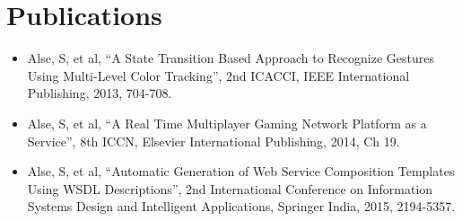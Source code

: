 \documentclass[a4paper,10pt]{article} %
\begin{document}
\section{Publications}
\begin{itemize}
\item Alse, S, et al, ``A State Transition Based Approach to Recognize Gestures Using Multi-Level Color Tracking'', 2nd ICACCI, IEEE International Publishing, 2013, 704-708.
\item Alse, S, et al, ``A Real Time Multiplayer Gaming Network Platform as a Service'', 8th ICCN, Elsevier International Publishing, 2014, Ch 19.
\item Alse, S, et al, ``Automatic Generation of Web Service Composition Templates Using WSDL Descriptions'', 2nd International Conference on Information Systems Design and Intelligent Applications, Springer India, 2015, 2194-5357.
\end{itemize}
\end{document}

